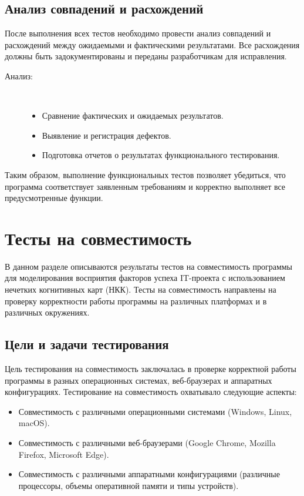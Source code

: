 \documentclass{article}
\begin{document}
    \subsection{Анализ совпадений и расхождений}

    После выполнения всех тестов необходимо провести анализ совпадений и расхождений между ожидаемыми и фактическими результатами. Все расхождения должны быть задокументированы и переданы разработчикам для исправления.

    \begin{description}
        \item [Анализ:]\\
        \begin{itemize}
            \item Сравнение фактических и ожидаемых результатов.
            \item Выявление и регистрация дефектов.
            \item Подготовка отчетов о результатах функционального тестирования.
        \end{itemize}
    \end{description}

    Таким образом, выполнение функциональных тестов позволяет убедиться, что программа соответствует заявленным требованиям и корректно выполняет все предусмотренные функции.
    \newpage
    \section{Тесты на совместимость}
    В данном разделе описываются результаты тестов на совместимость программы для моделирования восприятия факторов успеха IT-проекта с использованием нечетких когнитивных карт (НКК). Тесты на совместимость направлены на проверку корректности работы программы на различных платформах и в различных окружениях.

    \subsection{Цели и задачи тестирования}

    Цель тестирования на совместимость заключалась в проверке корректной работы программы в разных операционных системах, веб-браузерах и аппаратных конфигурациях. Тестирование на совместимость охватывало следующие аспекты:

    \begin{itemize}
        \item Совместимость с различными операционными системами (Windows, Linux, macOS).
        \item Совместимость с различными веб-браузерами (Google Chrome, Mozilla Firefox, Microsoft Edge).
        \item Совместимость с различными аппаратными конфигурациями (различные процессоры, объемы оперативной памяти и типы устройств).
    \end{itemize}
\end{document}
